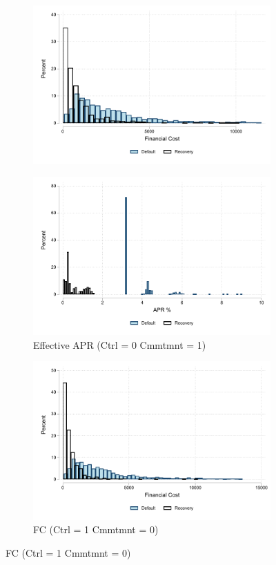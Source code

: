 \documentclass[oneside,11pt]{article}
\begin{document}
\begin{figure}[H]
\begin{center}
\begin{subfigure}{.45\textwidth}
        \includegraphics[width=\textwidth]{Figuras/hist_fc_0_1.pdf}
    \end{subfigure}
     \begin{subfigure}{0.45\textwidth}
    \caption{Effective APR (Ctrl = 0 Cmmtmnt = 1)}
       \centering
      \includegraphics[width=\textwidth]{Figuras/hist_apr_0_1.pdf}
    \end{subfigure}
   \begin{subfigure}{.45\textwidth}
      \caption{FC (Ctrl = 1 Cmmtmnt = 0)}
        \centering
        \includegraphics[width=\textwidth]{Figuras/hist_fc_1_0.pdf}

\end{subfigure}
\end{center}
\end{figure}
\end{document}
